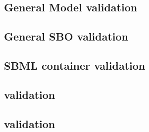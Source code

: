 \begin{sbmlenum}


\end{sbmlenum} \subsection*{General Model validation} \begin{sbmlenum}


\end{sbmlenum} \subsection*{General SBO validation} \begin{sbmlenum}


\end{sbmlenum} \subsection*{SBML container validation} \begin{sbmlenum}


\end{sbmlenum} \subsection*{ validation} \begin{sbmlenum}


\end{sbmlenum} \subsection*{ validation} \begin{sbmlenum}



\end{sbmlenum}
